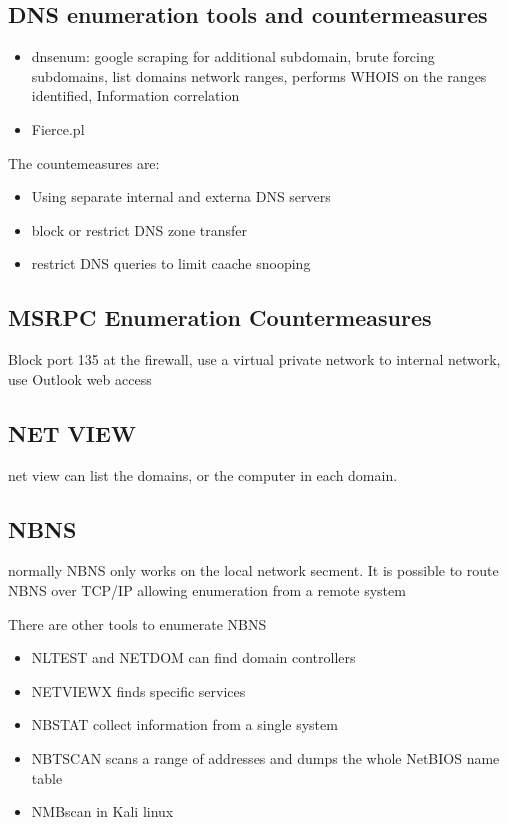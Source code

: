 \subsection{DNS enumeration tools and countermeasures}
\begin{itemize}
    \item dnsenum: google scraping for additional subdomain, brute forcing subdomains, list domains network ranges, performs WHOIS on the ranges identified, Information correlation
    \item Fierce.pl 
\end{itemize}

The countemeasures are:
\begin{itemize}
    \item Using separate internal and externa DNS servers
    \item block or restrict DNS zone transfer
    \item restrict DNS queries to limit caache snooping 
\end{itemize}

\subsection{MSRPC Enumeration Countermeasures}
Block port 135 at the firewall, use a virtual private network to internal network, use Outlook web access

\subsection{NET VIEW}
net view can list the domains, or the computer in each domain.
\subsection{NBNS}
normally NBNS only works on the local network secment. It is possible to route NBNS over TCP/IP allowing enumeration from a remote system

There are other tools to enumerate NBNS
\begin{itemize}
    \item NLTEST and NETDOM can find domain controllers
    \item NETVIEWX finds specific services
    \item NBSTAT collect information from a single system
    \item NBTSCAN scans a range of addresses and dumps the whole NetBIOS name table
    \item NMBscan in Kali linux
\end{itemize}

